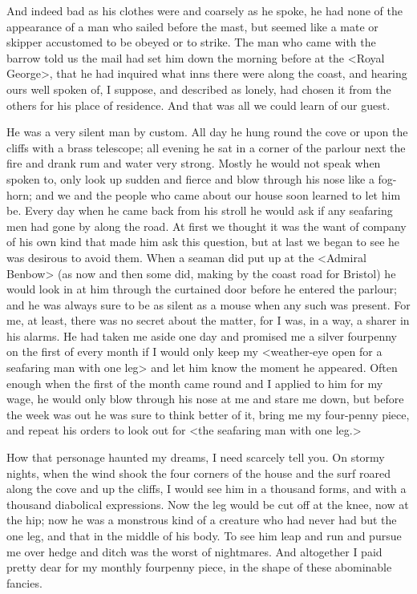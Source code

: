 And indeed bad as his clothes were and coarsely as he spoke, he had none of the appearance of a man who sailed before the mast, but seemed like a mate or skipper accustomed to be obeyed or to strike. The man who came with the barrow told us the mail had set him down the morning before at the <Royal George>, that he had inquired what inns there were along the coast, and hearing ours well spoken of, I suppose, and described as lonely, had chosen it from the others for his place of residence. And that was all we could learn of our guest.

He was a very silent man by custom. All day he hung round the cove or upon the cliffs with a brass telescope; all evening he sat in a corner of the parlour next the fire and drank rum and water very strong. Mostly he would not speak when spoken to, only look up sudden and fierce and blow through his nose like a fog-horn; and we and the people who came about our house soon learned to let him be. Every day when he came back from his stroll he would ask if any seafaring men had gone by along the road. At first we thought it was the want of company of his own kind that made him ask this question, but at last we began to see he was desirous to avoid them. When a seaman did put up at the <Admiral Benbow> (as now and then some did, making by the coast road for Bristol) he would look in at him through the curtained door before he entered the parlour; and he was always sure to be as silent as a mouse when any such was present. For me, at least, there was no secret about the matter, for I was, in a way, a sharer in his alarms. He had taken me aside one day and promised me a silver fourpenny on the first of every month if I would only keep my <weather-eye open for a seafaring man with one leg> and let him know the moment he appeared. Often enough when the first of the month came round and I applied to him for my wage, he would only blow through his nose at me and stare me down, but before the week was out he was sure to think better of it, bring me my four-penny piece, and repeat his orders to look out for <the seafaring man with one leg.>

How that personage haunted my dreams, I need scarcely tell you. On stormy nights, when the wind shook the four corners of the house and the surf roared along the cove and up the cliffs, I would see him in a thousand forms, and with a thousand diabolical expressions. Now the leg would be cut off at the knee, now at the hip; now he was a monstrous kind of a creature who had never had but the one leg, and that in the middle of his body. To see him leap and run and pursue me over hedge and ditch was the worst of nightmares. And altogether I paid pretty dear for my monthly fourpenny piece, in the shape of these abominable fancies.

